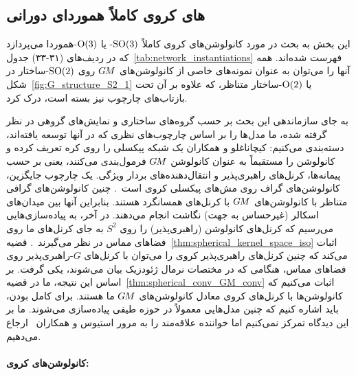 

\subsection{های کروی کاملاً هموردای دورانی}
\label{sec:spherical_CNNs_fully_equivariant}


این بخش به بحث در مورد کانولوشن‌های کروی کاملاً $\operatorname{SO}(3)$- یا $\operatorname{O}(3)$-هموردا می‌پردازد که در ردیف‌های (۳۱-۳۳) جدول~\ref{tab:network_instantiations} فهرست شده‌اند.
همه آنها را می‌توان به عنوان نمونه‌های خاصی از کانولوشن‌های $G\mkern-1.4muM$ روی $\operatorname{SO}(2)$-ساختار در شکل~\ref{fig:G_structure_S2_1} یا $\operatorname{O}(2)$-ساختار متناظر، که علاوه بر آن تحت بازتاب‌های چارچوب نیز بسته است، درک کرد.

به جای سازماندهی این بحث بر حسب گروه‌های ساختاری و نمایش‌های گروهی در نظر گرفته شده، ما مدل‌ها را بر اساس چارچوب‌های نظری که در آنها توسعه یافته‌اند، دسته‌بندی می‌کنیم:
\cite{kicanaoglu2019gaugeSphere} کیچاناغلو و همکاران یک شبکه پیکسلی را روی کره تعریف کرده و کانولوشن را مستقیماً به عنوان کانولوشن $G\mkern-1.4muM$ فرمول‌بندی می‌کنند، یعنی بر حسب پیمانه‌ها، کرنل‌های راهبری‌پذیر و انتقال‌دهنده‌های بردار ویژگی.
یک چارچوب جایگزین، کانولوشن‌های گراف روی مش‌های پیکسلی کروی است~\cite{perraudin2018DeepSphere,yang2020rotation}.
چنین کانولوشن‌های گرافی متناظر با کانولوشن‌های $G\mkern-1.4muM$ با کرنل‌های همسانگرد هستند.
بنابراین آنها بین میدان‌های اسکالر (غیرحساس به جهت) نگاشت انجام می‌دهند.
در آخر، به پیاده‌سازی‌هایی می‌رسیم که کرنل‌های کانولوشن (راهبری‌پذیر) را روی $S^2$ به جای کرنل‌های ما روی فضاهای مماس در نظر می‌گیرند~\cite{esteves2018zonalSpherical,Cohen2018-S2CNN,kondor2018ClebschGordan,esteves2020spinweighted}.
قضیه~\ref{thm:spherical_kernel_space_iso} اثبات می‌کند که چنین کرنل‌های راهبری‌پذیر کروی را می‌توان با کرنل‌های $G$-راهبری‌پذیر روی فضاهای مماس، هنگامی که در مختصات نرمال ژئودزیک بیان می‌شوند، یکی گرفت.
بر اساس این نتیجه، ما در قضیه~\ref{thm:spherical_conv_GM_conv} اثبات می‌کنیم که کانولوشن‌ها با کرنل‌های کروی معادل کانولوشن‌های $G\mkern-1.4muM$ ما هستند.
برای کامل بودن، باید اشاره کنیم که چنین مدل‌هایی معمولاً در حوزه طیفی پیاده‌سازی می‌شوند.
ما بر این دیدگاه تمرکز نمی‌کنیم اما خواننده علاقه‌مند را به مرور استیوس و همکاران~\cite{esteves2020theoretical} ارجاع می‌دهیم.


\paragraph{کانولوشن‌های \textit{} کروی:}

